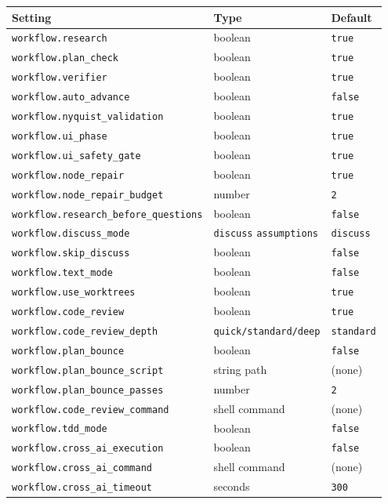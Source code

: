 \documentclass[10pt,letterpaper]{article}
\begin{document}
\begin{longtable}{@{}l l l@{}}
\toprule
\textbf{\footnotesize Setting} & \textbf{\footnotesize Type} & \textbf{\footnotesize Default} \\
\midrule
\endhead
\texttt{workflow.research} & boolean & \texttt{true} \\
\texttt{workflow.plan\_check} & boolean & \texttt{true} \\
\texttt{workflow.verifier} & boolean & \texttt{true} \\
\texttt{workflow.auto\_advance} & boolean & \texttt{false} \\
\texttt{workflow.nyquist\_validation} & boolean & \texttt{true} \\
\texttt{workflow.ui\_phase} & boolean & \texttt{true} \\
\texttt{workflow.ui\_safety\_gate} & boolean & \texttt{true} \\
\texttt{workflow.node\_repair} & boolean & \texttt{true} \\
\texttt{workflow.node\_repair\_budget} & number & \texttt{2} \\
\texttt{workflow.research\_before\_questions} & boolean & \texttt{false} \\
\texttt{workflow.discuss\_mode} & \texttt{discuss} \textbar{} \texttt{assumptions} & \texttt{discuss} \\
\texttt{workflow.skip\_discuss} & boolean & \texttt{false} \\
\texttt{workflow.text\_mode} & boolean & \texttt{false} \\
\texttt{workflow.use\_worktrees} & boolean & \texttt{true} \\
\texttt{workflow.code\_review} & boolean & \texttt{true} \\
\texttt{workflow.code\_review\_depth} & \texttt{quick/standard/deep} & \texttt{standard} \\
\texttt{workflow.plan\_bounce} & boolean & \texttt{false} \\
\texttt{workflow.plan\_bounce\_script} & string path & (none) \\
\texttt{workflow.plan\_bounce\_passes} & number & \texttt{2} \\
\texttt{workflow.code\_review\_command} & shell command & (none) \\
\texttt{workflow.tdd\_mode} & boolean & \texttt{false} \\
\texttt{workflow.cross\_ai\_execution} & boolean & \texttt{false} \\
\texttt{workflow.cross\_ai\_command} & shell command & (none) \\
\texttt{workflow.cross\_ai\_timeout} & seconds & \texttt{300} \\
\bottomrule
\end{longtable}
\end{document}

